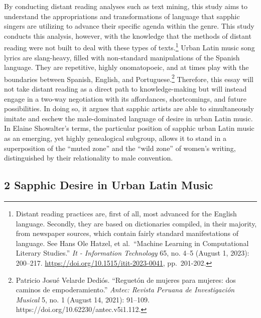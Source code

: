 \documentclass[
  letterpaper,
  DIV=11,
  numbers=noendperiod]{scrartcl}
\begin{document}
By conducting distant reading analyses such as text mining, this study
aims to understand the appropriations and transformations of language
that sapphic singers are utilizing to advance their specific agenda
within the genre. This study conducts this analysis, however, with the
knowledge that the methods of distant reading were not built to deal
with these types of texts.\footnote{Distant reading practices are, first
  of all, most advanced for the English language. Secondly, they are
  based on dictionaries compiled, in their majority, from newspaper
  sources, which contain fairly standard manifestations of language. See
  Hans Ole Hatzel, et al.~``Machine Learning in Computational Literary
  Studies.'' \emph{It - Information Technology} 65, no. 4--5 (August 1,
  2023): 200--217. \url{https://doi.org/10.1515/itit-2023-0041},
  pp.~201-202.} Urban Latin music song lyrics are slang-heavy, filled
with non-standard manipulations of the Spanish language. They are
repetitive, highly onomatopoeic, and at times play with the boundaries
between Spanish, English, and Portuguese.\footnote{Patricio Josué
  Velarde Dediós. ``Reguetón de mujeres para mujeres: dos caminos de
  empoderamiento.'' \emph{Antec: Revista Peruana de Investigación
  Musical} 5, no. 1 (August 14, 2021): 91--109.
  https://doi.org/10.62230/antec.v5i1.112.} Therefore, this essay will
not take distant reading as a direct path to knowledge-making but will
instead engage in a two-way negotiation with its affordances,
shortcomings, and future possibilities. In doing so, it argues that
sapphic artists are able to simultaneously imitate and eschew the
male-dominated language of desire in urban Latin music. In Elaine
Showalter's terms, the particular position of sapphic urban Latin music
as an emerging, yet highly genealogical subgroup, allows it to stand in
a superposition of the ``muted zone'' and the ``wild zone'' of women's
writing, distinguished by their relationality to male convention.

\hypertarget{sapphic-desire-in-urban-latin-music}{%
\subsection{\texorpdfstring{2 \textbf{Sapphic Desire in Urban Latin
Music}}{2 Sapphic Desire in Urban Latin Music}}\label{sapphic-desire-in-urban-latin-music}}
\end{document}
